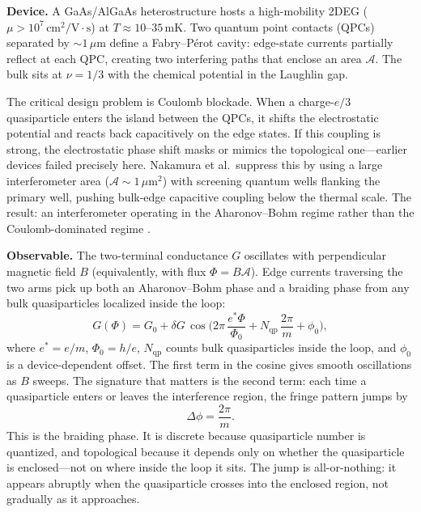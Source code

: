\medskip
\noindent\textbf{Device.}
A GaAs/AlGaAs heterostructure hosts a high-mobility 2DEG ($\mu > 10^{7}\,\text{cm}^{2}/\text{V}\cdot\text{s}$) at $T \approx 10$--$35\,\text{mK}$.  Two quantum point contacts (QPCs) separated by $\sim 1\,\mu\text{m}$ define a Fabry--P\'erot cavity: edge-state currents partially reflect at each QPC, creating two interfering paths that enclose an area $\mathcal{A}$.  The bulk sits at $\nu = 1/3$ with the chemical potential in the Laughlin gap.

The critical design problem is Coulomb blockade.  When a charge-$e/3$ quasiparticle enters the island between the QPCs, it shifts the electrostatic potential and reacts back capacitively on the edge states.  If this coupling is strong, the electrostatic phase shift masks or mimics the topological one---earlier devices failed precisely here.  Nakamura et al.\ suppress this by using a large interferometer area ($\mathcal{A} \sim 1\,\mu\text{m}^{2}$) with screening quantum wells flanking the primary well, pushing bulk-edge capacitive coupling below the thermal scale.  The result: an interferometer operating in the Aharonov--Bohm regime rather than the Coulomb-dominated regime \cite{RosenowHalperinInterferometryPlaceholder}.

\medskip
\noindent\textbf{Observable.}
The two-terminal conductance $G$ oscillates with perpendicular magnetic field $B$ (equivalently, with flux $\Phi = B\mathcal{A}$).  Edge currents traversing the two arms pick up both an Aharonov--Bohm phase and a braiding phase from any bulk quasiparticles localized inside the loop:
\begin{equation}
  G(\Phi) = G_0 + \delta G\,\cos\!\Big(
    2\pi\,\frac{e^{*}\Phi}{\Phi_0} + N_{\mathrm{qp}}\,\frac{2\pi}{m} + \phi_0
  \Big),
  \label{eq:nakamura-conductance}
\end{equation}
where $e^{*} = e/m$, $\Phi_0 = h/e$, $N_{\mathrm{qp}}$ counts bulk quasiparticles inside the loop, and $\phi_0$ is a device-dependent offset.  The first term in the cosine gives smooth oscillations as $B$ sweeps.  The signature that matters is the second term: each time a quasiparticle enters or leaves the interference region, the fringe pattern jumps by
\begin{equation}
  \Delta\phi = \frac{2\pi}{m}.
  \label{eq:nakamura-phase-jump}
\end{equation}
This is the braiding phase.  It is discrete because quasiparticle number is quantized, and topological because it depends only on whether the quasiparticle is enclosed---not on where inside the loop it sits.  The jump is all-or-nothing: it appears abruptly when the quasiparticle crosses into the enclosed region, not gradually as it approaches.

